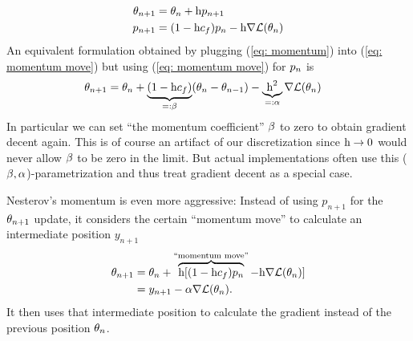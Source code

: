 \begin{definition}
	\begin{subequations}
	\begin{align}
		\theta_{n+1} &= \theta_n + \text{h} p_{n+1} \label{eq: momentum move}\\
		p_{n+1} &= (1-\text{h}c_f)p_n - \text{h}\nabla \mathcal{L}(\theta_n)
		\label{eq: momentum}
	\end{align}
	\end{subequations}
	An equivalent formulation obtained by plugging (\ref{eq: momentum}) into
	(\ref{eq: momentum move}) but using (\ref{eq: momentum move}) for
	\(p_n\) is
	\begin{align}\label{eq: flat momentum}
		\theta_{n+1}
		&= \theta_n
		+ \underbrace{(1-\text{h}c_f)}_{
			=:\beta
		}(\theta_n - \theta_{n-1})
		- \underbrace{\text{h}^2}_{=:\alpha}\nabla \mathcal{L}(\theta_n)
	\end{align}
	In particular we can set ``the momentum coefficient'' \(\beta\) to zero to
	obtain gradient decent again. This is of course an artifact of our
	discretization since \(\text{h}\to0\) would never allow \(\beta\) to be zero
	in the limit. But actual implementations often use this
	(\(\beta,\alpha\))-parametrization and thus treat gradient decent as a
	special case.
\end{definition}
%
Nesterov's momentum is even more aggressive: Instead of using \(p_{n+1}\) for
the \(\theta_{n+1}\) update, it considers the certain ``momentum move''
to calculate an intermediate position \(y_{n+1}\)
%
\begin{align*}
	\theta_{n+1}
	&= \theta_n + \overbrace{\text{h} [(1-\text{h}c_f)p_n}^{\text{``momentum move''}}
	- \text{h}\nabla \mathcal{L}(\theta_n)] \\
	&= y_{n+1} - \alpha \nabla \mathcal{L}(\theta_n).
\end{align*}
%
It then uses that intermediate position to calculate the gradient instead of the
previous position \(\theta_n\).
%
